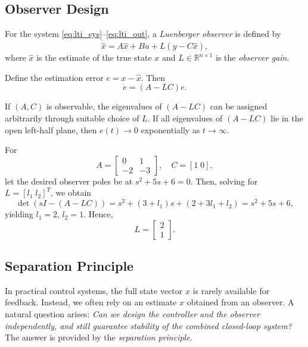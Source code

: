 \subsection{Observer Design}

\begin{definition}
For the system \eqref{eq:lti_sys}--\eqref{eq:lti_out}, a \emph{Luenberger observer} is defined by
\begin{equation}
    \dot{\hat{x}} = A\hat{x} + B u + L (y - C\hat{x}),
\end{equation}
where $\hat{x}$ is the estimate of the true state $x$ and $L\in\mathbb{R}^{n\times 1}$ 
is the \emph{observer gain}.
\end{definition}

Define the estimation error $e = x - \hat{x}$. Then
\begin{equation}
    \dot{e} = (A - L C)e.
\end{equation}

\begin{theorem}
If $(A,C)$ is observable, the eigenvalues of $(A - LC)$ can be assigned arbitrarily 
through suitable choice of $L$.  
If all eigenvalues of $(A - L C)$ lie in the open left-half plane, 
then $e(t) \to 0$ exponentially as $t \to \infty$.
\end{theorem}

\begin{example}
For 
\[
A = \begin{bmatrix} 0 & 1 \\ -2 & -3 \end{bmatrix}, 
\quad 
C = [1 \; 0],
\]
let the desired observer poles be at $s^2 + 5s + 6 = 0$.  
Then, solving for $L = [l_1 \; l_2]^T$, we obtain
\[
\det(sI - (A - L C)) = s^2 + (3 + l_1)s + (2 + 3l_1 + l_2) = s^2 + 5s + 6,
\]
yielding $l_1 = 2$, $l_2 = 1$.  
Hence,
\[
L = \begin{bmatrix} 2 \\ 1 \end{bmatrix}.
\]
\end{example}

\subsection{Separation Principle}

In practical control systems, the full state vector $x$ is rarely available for feedback. 
Instead, we often rely on an estimate $\hat{x}$ obtained from an observer.  
A natural question arises: \emph{Can we design the controller and the observer independently, 
and still guarantee stability of the combined closed-loop system?}  
The answer is provided by the \emph{separation principle}.

